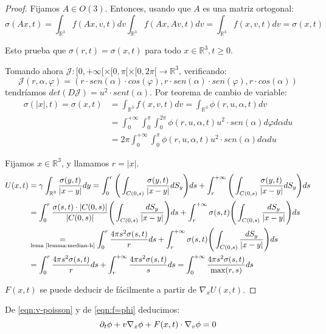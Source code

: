 \documentclass[a4paper,10pt]{scrartcl}
\theoremstyle{definition}
\numberwithin{equation}{section}
\begin{document}
\begin{proof}
Fijamos $A \in O(3)$. Entonces, usando que $A$ es una matriz ortogonal:
 \[
 \sigma(Ax,t) = \int_{\mathbb{R}^3} f(Ax,v,t) dv \int_{\mathbb{R}^3} f(Ax,Av,t) dv = \int_{\mathbb{R}^3} f(x,v,t) dv = \sigma(x,t)
 \]
 
 Esto prueba que $\sigma(r,t) = \sigma(x,t)$ para todo $x\in \mathbb{R}^3, t\ge 0$.
 
 Tomando ahora $\mathcal{J}:[0,+\infty[ \times [0,\pi[ \times [0,2\pi[ \rightarrow \mathbb{R}^3$, verificando:
 \[\mathcal{J}(r,\alpha, \varphi) = (r\cdot sen(\alpha) \cdot cos(\varphi), r\cdot sen(\alpha) \cdot sen(\varphi), r\cdot cos(\alpha))\]
 tendríamos $det(D\mathcal{J}) = u^2 \cdot sent(\alpha)$. Por teorema de cambio de variable: 
 \begin{align*}
  \sigma(|x|,t) = \sigma(x,t) &= \int_{\mathbb{R}^3} f(x,v,t) dv = \int_{\mathbb{R}^3} \phi(r,u,\alpha,t) dv \\
  &= \int_0^{+\infty} \int_0^\pi \int_0^{2\pi} \phi(r,u,\alpha,t) u^2 \cdot sen(\alpha) d\varphi d\alpha du \\
  &= 2\pi \int_0^{+\infty} \int_0^\pi \phi(r,u,\alpha,t) u^2 \cdot sen(\alpha) d\alpha du
 \end{align*}
 
 Fijamos $x\in \mathbb{R}^3$, y llamamos $r=|x|$.
 \begin{align*}
 U(x,t) &= \gamma \int_{\mathbb{R}^3} \frac{\sigma(y,t)}{|x-y|} dy = \int_0^r \Bigg(\int_{C(0,s)} \frac{\sigma(y,t)}{|x-y|} dS_y\Bigg)ds + 
 \int_r^{+\infty} \Bigg(\int_{C(0,s)} \frac{\sigma(y,t)}{|x-y|} dS_y\Bigg)ds \\
 &= \int_0^r \frac{\sigma(s,t)\cdot |C(0,s)|}{|C(0,s)|} \Bigg(\int_{C(0,s)} \frac{dS_y}{|x-y|}\Bigg) ds + \int_r^{+\infty} \sigma(s,t) \Bigg(\int_{C(0,s)} \frac{dS_y}{|x-y|}\Bigg) ds \\
 &\underset{\textrm{lema \ref{lemma:median-h}}}{=} \int_0^r \frac{4\pi s^2 \sigma(s,t)}{r} ds + 
 \int_r^{+\infty} \sigma(s,t) \Bigg(\int_{C(0,s)} \frac{dS_y}{|x-y|} \Bigg) ds \\
 &= \int_0^r \frac{4\pi s^2 \sigma(s,t)}{r} ds + 
 \int_r^{+\infty} \frac{4\pi s^2 \sigma(s,t)}{s} ds = \int_0^{+\infty} \frac{4\pi s^2 \sigma(s,t)}{\max(r,s)} ds
 \end{align*}
 
 $F(x,t)$ se puede deducir de fácilmente a partir de $\nabla_x U(x,t)$.
\end{proof}

De \eqref{eqn:v-poisson} y de \eqref{eqn:f=phi} deducimos:
\[
\partial_t \phi + v \nabla_x \phi + F(x,t) \cdot \nabla_v \phi = 0\\
\]
\end{document}
